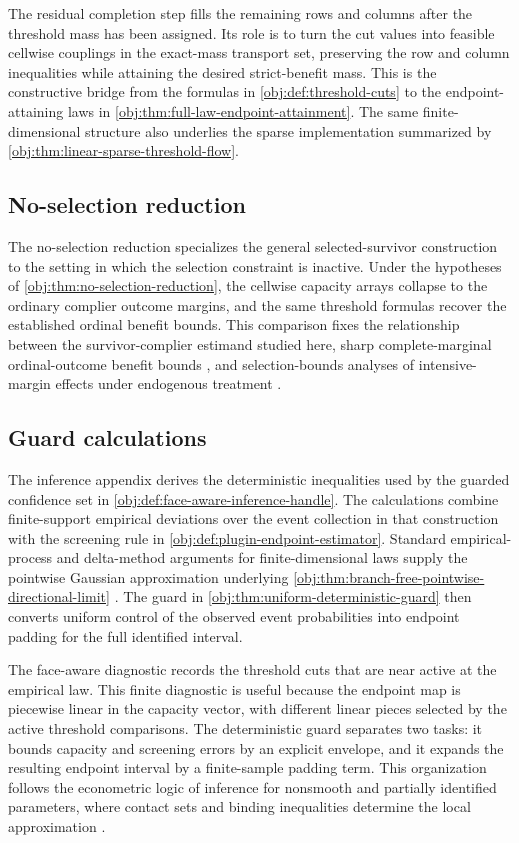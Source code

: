 \documentclass[11pt]{article}
\begin{document}
The residual completion step fills the remaining rows and columns after the threshold mass has been assigned.  Its role is to turn the cut values into feasible cellwise couplings in the exact-mass transport set, preserving the row and column inequalities while attaining the desired strict-benefit mass.  This is the constructive bridge from the formulas in \cref{obj:def:threshold-cuts} to the endpoint-attaining laws in \cref{obj:thm:full-law-endpoint-attainment}.  The same finite-dimensional structure also underlies the sparse implementation summarized by \cref{obj:thm:linear-sparse-threshold-flow}.

\subsection{No-selection reduction}

The no-selection reduction specializes the general selected-survivor construction to the setting in which the selection constraint is inactive.  Under the hypotheses of \cref{obj:thm:no-selection-reduction}, the cellwise capacity arrays collapse to the ordinary complier outcome margins, and the same threshold formulas recover the established ordinal benefit bounds.  This comparison fixes the relationship between the survivor-complier estimand studied here, sharp complete-marginal ordinal-outcome benefit bounds \citep{LuDingDasgupta2018}, and selection-bounds analyses of intensive-margin effects under endogenous treatment \citep{DongHeiler2026}.

\subsection{Guard calculations}

The inference appendix derives the deterministic inequalities used by the guarded confidence set in \cref{obj:def:face-aware-inference-handle}.  The calculations combine finite-support empirical deviations over the event collection in that construction with the screening rule in \cref{obj:def:plugin-endpoint-estimator}.  Standard empirical-process and delta-method arguments for finite-dimensional laws supply the pointwise Gaussian approximation underlying \cref{obj:thm:branch-free-pointwise-directional-limit} \citep{vanDerVaart1998}.  The guard in \cref{obj:thm:uniform-deterministic-guard} then converts uniform control of the observed event probabilities into endpoint padding for the full identified interval.

The face-aware diagnostic records the threshold cuts that are near active at the empirical law.  This finite diagnostic is useful because the endpoint map is piecewise linear in the capacity vector, with different linear pieces selected by the active threshold comparisons.  The deterministic guard separates two tasks: it bounds capacity and screening errors by an explicit envelope, and it expands the resulting endpoint interval by a finite-sample padding term.  This organization follows the econometric logic of inference for nonsmooth and partially identified parameters, where contact sets and binding inequalities determine the local approximation \citep{FangSantos2019}.
\end{document}
